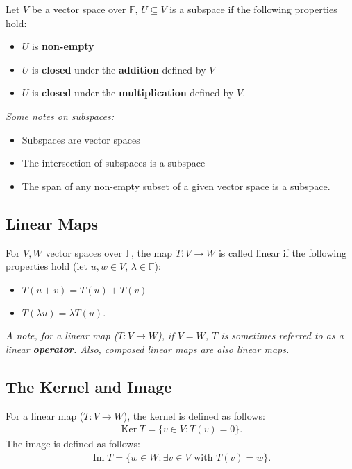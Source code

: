 \documentclass[a4paper, 12pt, twoside]{article}
\DeclareMathOperator{\Ker}{Ker}
\DeclareMathOperator{\Ima}{Im}
\begin{document}
Let $V$ be a vector space over $\mathbb{F}$, $U \subseteq V$ is a subspace if
the following properties hold:

\begin{itemize}
  \item $U$ is \textbf{non-empty}
  \item $U$ is \textbf{closed} under the \textbf{addition} defined by $V$
  \item $U$ is \textbf{closed} under the \textbf{multiplication} defined by $V$.
\end{itemize}

\textit{Some notes on subspaces:}

\begin{itemize}
  \item Subspaces are vector spaces
  \item The intersection of subspaces is a subspace
  \item The span of any non-empty subset of a given vector space is a subspace.
\end{itemize}

\subsection{Linear Maps}

For $V, W$ vector spaces over $\mathbb{F}$, the map $T: V \to W$ is called linear
if the following properties hold (let $u, w \in V$, $\lambda \in \mathbb{F}$):

\begin{itemize}
  \item $T(u + v) = T(u) + T(v)$
  \item $T(\lambda u) = \lambda T(u)$.
\end{itemize}

\textit{A note, for a linear map ($T: V \to W$), if $V = W$, $T$ is sometimes
  referred to as a linear \textbf{operator}. Also, composed linear maps are also linear maps.}

\subsection{The Kernel and Image}

For a linear map ($T: V \to W$), the kernel is defined as follows:
\begin{align*}
  \Ker{T} = \{v \in V : T(v) = 0\}.
\end{align*}
The image is defined as follows:
\begin{align*}
  \Ima{T} = \{w \in W : \exists v \in V \text{ with } T(v) = w\}.
\end{align*}
\end{document}
